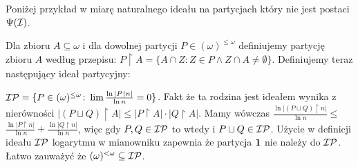 \documentclass[12pt]{article}
\theoremstyle{plain}
\theoremstyle{definition}
\theoremstyle{remark}
\newcommand{\cI}{{\cal I}}
\newcommand{\cP}{{\cal P}}
\newcommand{\Part}{(\omega)^{\leq\omega}}
\newcommand{\FinPart}{(\omega)^{<\omega}}
\begin{document}
Poniżej przykład w miarę naturalnego ideału na 
partycjach który nie jest postaci $\Psi(\cI)$.

Dla zbioru $A \subseteq \omega$ i dla dowolnej
partycji $P\in\Part$ definiujemy
partycję zbioru $A$ według przepisu:
$P\restriction A = \{A \cap Z\colon
Z \in P \wedge Z\cap A \not=\emptyset\}$.
Definiujemy teraz następujący ideał
partycyjny:

$\cI\cP = \{P \in \Part\colon \lim \frac{\ln |P \restriction n|}{\ln n} = 0\}$.
Fakt że ta rodzina jest ideałem wynika z nierówności
$|(P \sqcup Q) \restriction A| \leq |P \restriction A| \cdot |Q \restriction A|$.
Mamy wówczas 
$\frac{\ln |(P \sqcup Q) \restriction n|}{\ln n} \leq $
$\frac{\ln |P \restriction n|}{\ln n} + \frac{\ln |Q \restriction n|}{\ln n}$,
więc gdy $P,Q\in\cI\cP$ to wtedy i $P \sqcup Q\in\cI\cP$.
Użycie w definicji ideału $\cI\cP$ logarytmu 
w mianowniku zapewnia że partycja ${\bf 1}$ nie
należy do $\cI\cP$.
Łatwo zauważyć że $\FinPart\subseteq \cI\cP$. 
\end{document}
